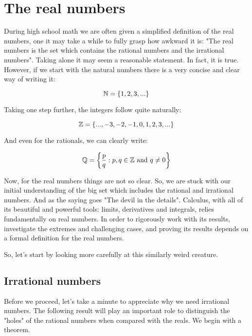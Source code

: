 \chapter{The real numbers}

During high school math we are often given a simplified definition of the real numbers, one it may take a while to fully grasp how awkward it is: "The real numbers is the set which contains the rational numbers and the irrational numbers". Taking alone it may seem a reasonable statement. In fact, it is true. However, if we start with the natural numbers there is a very concise and clear way of writing it:

\begin{equation}
    \mathbb{N} = \{1, 2, 3, ...\}
\end{equation}

Taking one step further, the integers follow quite naturally:

\begin{equation}
    \mathbb{Z} = \{..., -3, -2, -1, 0, 1, 2, 3, ... \}
\end{equation}

And even for the rationals, we can clearly write:

\begin{equation}
    \mathbb{Q} = \left \{
        \frac{p}{q}: p, q \in \mathbb{Z} \text{ and } q \neq 0
    \right \}
\end{equation}

Now, for the real numbers things are not so clear. So, we are stuck with our initial understanding of the big set which includes the rational and irrational numbers. And as the saying goes "The devil in the details". Calculus, with all of its beautiful and powerful tools: limits, derivatives and integrals, relies fundamentally on real numbers. In order to rigorously work with its results, investigate the extremes and challenging cases, and proving its results depends on a formal definition for the real numbers.

So, let's start by looking more carefully at this similarly weird creature.

\section{Irrational numbers}

Before we proceed, let's take a minute to appreciate why we need irrational numbers. The following result will play an important role to distinguish the "holes" of the rational numbers when compared with the reals. We begin with a theorem.

